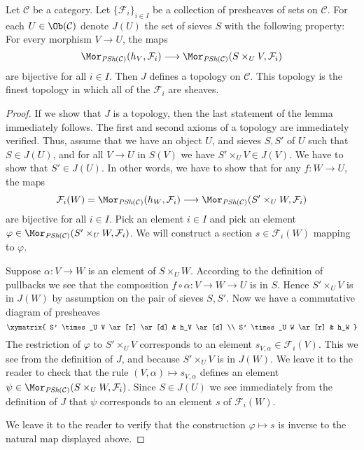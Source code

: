 \begin{lemma}
\label{lemma-topology-presheaves-sheaves}
Let $\mathcal{C}$ be a category. Let $\{ \mathcal{F}_i \}_{i\in I}$ be a
collection of presheaves of sets on $\mathcal{C}$. For each
$U \in \Ob(\mathcal{C})$ denote
$J(U)$ the set of sieves $S$ with the following property:
For every morphism $V \to U$, the maps
$$
\Mor_{\textit{PSh}(\mathcal{C})}(h_V, \mathcal{F}_i)
\longrightarrow
\Mor_{\textit{PSh}(\mathcal{C})}(S \times_U V, \mathcal{F}_i)
$$
are bijective for all $i \in I$. Then $J$ defines a
topology on $\mathcal{C}$. This topology is the finest
topology in which all of the $\mathcal{F}_i$ are sheaves.
\end{lemma}

\begin{proof}
If we show that $J$ is a topology, then the last statement of
the lemma immediately follows. The first and second axioms of
a topology are immediately verified. Thus, assume that
we have an object $U$, and sieves $S, S'$ of $U$
such that $S \in J(U)$, and for all $V \to U$ in $S(V)$
we have $S' \times_U V \in J(V)$. We have to show that
$S' \in J(U)$. In other words, we have to show that for
any $f : W \to U$, the maps
$$
\mathcal{F}_i(W) =
\Mor_{\textit{PSh}(\mathcal{C})}(h_W, \mathcal{F}_i)
\longrightarrow
\Mor_{\textit{PSh}(\mathcal{C})}(S' \times_U W, \mathcal{F}_i)
$$
are bijective for all $i \in I$. Pick an element
$i \in I$ and pick an element
$\varphi \in
\Mor_{\textit{PSh}(\mathcal{C})}(S' \times_U W, \mathcal{F}_i)$.
We will construct a section $s \in \mathcal{F}_i(W)$
mapping to $\varphi$.

\medskip\noindent
Suppose $\alpha : V \to W$ is an element of $S \times_U W$.
According to the definition of pullbacks we see that
the composition $f \circ\alpha : V \to W  \to U$ is in $S$. Hence
$S' \times_U V$ is in $J(W)$ by assumption on the pair
of sieves $S, S'$. Now we have a commutative diagram
of presheaves
$$
\xymatrix{
S' \times_U V \ar[r] \ar[d] & h_V \ar[d] \\
S' \times_U W \ar[r] & h_W
}
$$
The restriction of $\varphi$ to $S' \times_U V$
corresponds to an element $s_{V, \alpha} \in \mathcal{F}_i(V)$.
This we see from the definition of $J$,
and because $S' \times_U V$ is in $J(W)$.
We leave it to the reader to check
that the rule $(V, \alpha) \mapsto s_{V, \alpha}$ defines
an element
$\psi \in
\Mor_{\textit{PSh}(\mathcal{C})}(S \times_U W, \mathcal{F}_i)$.
Since $S \in J(U)$ we see immediately from the definition of $J$
that $\psi$ corresponds to an element $s$ of $\mathcal{F}_i(W)$.

\medskip\noindent
We leave it to the reader to verify that the construction
$\varphi \mapsto s$ is inverse to the natural map displayed above.
\end{proof}

